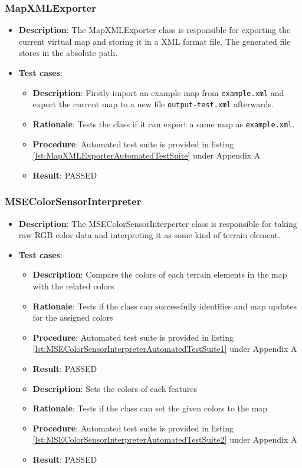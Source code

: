 \documentclass[12pt,a4paper]{article}
\begin{document}
    \subsubsection{MapXMLExporter}
	\begin{itemize}
	\item \textbf{Description}: The MapXMLExporter class is responsible for exporting the current virtual map and storing it in a XML format file.  The generated file stores in the absolute path.  
	\item \textbf{Test cases}:
	\begin{itemize}
		\item \textbf{Description}:	Firstly import an example map from \texttt{example.xml} and export the current map to a new file \texttt{output-test.xml} afterwards. 
		\item \textbf{Rationale}: Tests the class if it can export a same map as \texttt{example.xml}.
		\item \textbf{Procedure}: Automated test suite is provided in listing \ref{lst:MapXMLExporterAutomatedTestSuite} under Appendix A
		\item \textbf{Result}: PASSED
	\end{itemize}
	\end{itemize}
    
    \subsubsection{MSEColorSensorInterpreter}
	\begin{itemize}
	\item \textbf{Description}: The MSEColorSensorInterperter class is responsible for taking raw RGB color data and interpreting it as some kind of terrain element.
	\item \textbf{Test cases}:
	\begin{itemize}
		\item \textbf{Description}:	Compare the colors of each terrain elements in the map with the related colors
		\item \textbf{Rationale}: Tests if the class can successfully identifies and map updates for the assigned colors
		\item \textbf{Procedure}: Automated test suite is provided in listing \ref{lst:MSEColorSensorInterpreterAutomatedTestSuite1} under Appendix A
		\item \textbf{Result}: PASSED
	\end{itemize}
    \begin{itemize}
		\item \textbf{Description}:	Sets the colors of each features
		\item \textbf{Rationale}: Tests if the class can set the given colors to the map
		\item \textbf{Procedure}: Automated test suite is provided in listing \ref{lst:MSEColorSensorInterpreterAutomatedTestSuite2} under Appendix A
		\item \textbf{Result}: PASSED
	\end{itemize}
	\end{itemize}
    
\end{document}
